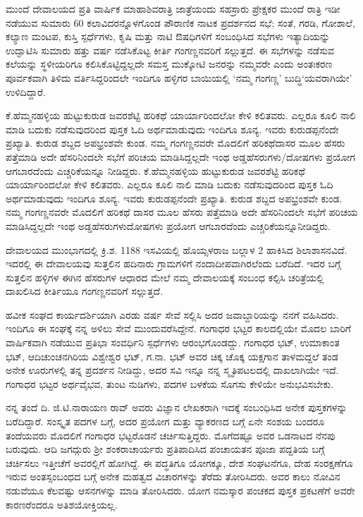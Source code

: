 {ಮುಂದೆ ದೇವಾಲಯದ ಪ್ರತಿ ವಾರ್ಷಿಕ ಮಾಹಾಶಿವರಾತ್ರಿ ಜಾತ್ರೆಯಂದು ಸಹಸ್ರಾರು ಪ್ರೇಕ್ಷಕರ ಮುಂದೆ ರಾತ್ರಿ ಇಡೀ ನಡೆಯುವ ಸುಮಾರು 60 ಕಲಾವಿದರನ್ನೊಳ\-ಗೊಂಡ ಪೌರಾಣಿಕ ನಾಟಕ ಪ್ರದರ್ಶನದ ಸಭೆ;  ಸಂತೆ, ಗರಡಿ, ಗೋಶಾಲೆ, ಕಲ್ಯಾಣ ಮಂಟಪ, ಕುಸ್ತಿ ಸ್ಪರ್ಧೆಗಳು, ಕೃಷಿ ಮತ್ತು ನಾಟಿ ಔಷಧಿಗಳಿಗೆ ಸಂಬಂಧಿಸಿದ ಸಭೆಗಳು ಇತ್ಯಾದಿಯನ್ನು ಉದ್ಘಾಟಿಸಿ ಸುಮಾರು ಹತ್ತು ವರ್ಷ ನಡೆಸಿಕೊಟ್ಟ ಕೀರ್ತಿ ಗಂಗಣ್ಣ\-ನವರಿಗೆ ಸಲ್ಲುತ್ತದೆ. ಈ ಸಭೆಗಳನ್ನು ನಡೆಸುವ ಕಲೆಯನ್ನು ಸ್ಥಳೀಯರಿಗೂ ಕಲಿಸಿ\-ಕೊಟ್ಟಿದ್ದಲ್ಲದೇ ಸಮಸ್ತ ಮುಕ್ಕೋಟಿ ಜನರನ್ನು ನಮ್ಮವರೇ ಎಂದು ಅಂತಃಕರಣ ಪೂರ್ವಕವಾಗಿ ತಿಳಿದು ವರ್ತಿಸಿದ್ದರಿಂದಲೇ ಇಂದಿಗೂ ಹಳ್ಳಿಗರ ಬಾಯಿಯಲ್ಲಿ  ‘ನಮ್ಮ ಗಂಗಣ್ಣ’ ಬುದ್ಧಿ‘ಯವರಾಗಿಯೇ’ ಉಳಿದಿದ್ದಾರೆ.

ಕೆ.ಹೆಮ್ಮನಹಳ್ಳಿಯ ಹುಟ್ಟುಕುರುಡ ಜವರಶೆಟ್ಟಿ ಹರಿಕಥೆ ಯಾರ್ಯಾರಿಂದಲೋ ಕೇಳಿ ಕಲಿತವರು. ಎಲ್ಲರೂ ಕೂಲಿ  \enginline{-}  ನಾಲಿ ಮಾಡಿ ಬದುಕು ನಡೆಸುವುದರಿಂದ ಪುಸ್ತಕ ಓದಿ ಅರ್ಥಮಾಡುವುದು ಇಂದಿಗೂ ಶೂನ್ಯ. ಇವರು ಕುರುಡಪ್ಪನೆಂದೇ ಪ್ರಖ್ಯಾತಿ. ಕುರುಡ ಶಬ್ದದ ಅಪಭ್ರಂಶವೇ ಕುಂಡ. ನಮ್ಮ ಗಂಗಣ್ಣನವರೇ ಮೊದಲಿಗೆ ಹರಿಕಥೆದಾಸರ ಮೂಲ ಹೆಸರು ಪತ್ತೆಮಾಡಿ ಅದೇ ಹೆಸರಿನಿಂದಲೇ ಸಭೆಗೆ ಪರಿಚಯ ಮಾಡಿಸಿದ್ದಲ್ಲದೇ ಇಂಥ ಅಡ್ಡಹೆಸರುಗಳು/ದೋಷಗಳು ಪ್ರಯೋಗ ಆಗಬಾರದೆಂದು ಎಚ್ಚರಿಕೆಯನ್ನೂ ನೀಡಿದ್ದರು.
ಕೆ.ಹೆಮ್ಮನಹಳ್ಳಿಯ ಹುಟ್ಟುಕುರುಡ ಜವರಶೆಟ್ಟಿ ಹರಿಕಥೆ ಯಾರ್ಯಾರಿಂದಲೋ ಕೇಳಿ ಕಲಿತವರು. ಎಲ್ಲರೂ ಕೂಲಿ  \enginline{-}  ನಾಲಿ ಮಾಡಿ ಬದುಕು ನಡೆಸುವುದರಿಂದ ಪುಸ್ತಕ ಓದಿ ಅರ್ಥಮಾಡುವುದು ಇಂದಿಗೂ ಶೂನ್ಯ. ಇವರು ಕುರುಡಪ್ಪನೆಂದೇ ಪ್ರಖ್ಯಾತಿ. ಕುರುಡ ಶಬ್ದದ ಅಪಭ್ರಂಶವೇ ಕುಂಡ. ನಮ್ಮ ಗಂಗಣ್ಣನವರೇ ಮೊದಲಿಗೆ ಹರಿಕಥೆ ದಾಸರ ಮೂಲ ಹೆಸರು ಪತ್ತೆಮಾಡಿ ಅದೇ ಹೆಸರಿನಿಂದಲೇ ಸಭೆಗೆ ಪರಿಚಯ ಮಾಡಿಸಿದ್ದಲ್ಲದೇ ಇಂಥ ಅಡ್ಡಹೆಸರುಗಳು\enginline{-}ದೋಷಗಳು ಪ್ರಯೋಗ ಆಗಬಾರದೆಂದು ಎಚ್ಚರಿಕೆಯನ್ನೂ\break ನೀಡಿದ್ದರು.

ದೇವಾಲಯದ ಮುಂಭಾಗದಲ್ಲಿ ಕ್ರಿ.ಶ. 1188 ಇಸವಿಯಲ್ಲಿ ಹೊಯ್ಸಳರಾಜ ಬಲ್ಲಾಳ 2 ಹಾಕಿಸಿದ ಶಿಲಾಶಾಸನವಿದೆ. ಇದರಲ್ಲಿ ಈ ದೇವಾಲಯವು ಸುತ್ತಲಿನ ಹದಿನಾರು ಗ್ರಾಮಗಳಿಗೆ ನಂದಾದೀಪವಾಗಿರಲೆಂದು ಬರೆದಿದೆ. ಇದರ ಬಗ್ಗೆ ಸುತ್ತಲಿನ ಹಳ್ಳಿಗಳ ಈಗಿನ ಹೆಸರುಗಳ ಆಧಾರದ ಮೇಲೆ ನಮ್ಮ ದೇವಾಲಯಕ್ಕೆ ಸಂಬಂಧ ಕಲ್ಪಿಸಿ ಚರಿತ್ರೆಯಲ್ಲಿ ದಾಖಲಿಸಿದ ಕೀರ್ತಿಯೂ ಗಂಗಣ್ಣನವರಿಗೆ ಸಲ್ಲುತ್ತದೆ.

ಹವೀಕ ಸಂಘದ ಕಾರ್ಯದರ್ಶಿಯಾಗಿ ಎರಡು ವರ್ಷ ಸೇವೆ ಸಲ್ಲಿಸಿ ಅದರ ಜವಾಬ್ದಾರಿಯನ್ನು ನನಗೆ ವಹಿಸಿದರು. ಇಂದಿಗೂ ಈ ಸಂಘಕ್ಕೆ ನನ್ನ ಅಳಿಲು ಸೇವೆ ಮುಂದುವರೆಸಿದ್ದೇನೆ. ಗಂಗಾಧರ ಭಟ್ಟರ ಕಾಲದಲ್ಲಿಯೇ ಮೊದಲ ಬಾರಿಗೆ ವಾರ್ಷಿಕವಾಗಿ ನಡೆಯುವ ಪ್ರತಿಭಾ ಸಂವರ್ಧಿನಿ ಸ್ಪರ್ಧೆಗಳು ಆರಂಭಗೊಂಡದ್ದು. ಗಂಗಾಧರ ಭಟ್, ಉಮಾಕಾಂತ ಭಟ್, ಆದಿಚುಂಚನಗಿರಿಯ ವಿಶ್ವೇಶ್ವರ ಭಟ್, ಗ.ನಾ. ಭಟ್ ಅವರ ಚಿಕ್ಕ  \enginline{-}  ಚೊಕ್ಕ ಯಕ್ಷಗಾನ ತಾಳಮದ್ದಲೆ ತಂಡ ಅನೇಕ ಊರುಗಳಲ್ಲಿ ತನ್ನ ಪ್ರದರ್ಶನ ನೀಡಿದ್ದು, ಅದರ ಸವಿ ಇನ್ನೂ ನನ್ನ ಸ್ಮೃತಿಪಟಲದಲ್ಲಿ ದಾಖಲಾಗಿಯೇ ಇದೆ. ಗಂಗಾಧರ ಭಟ್ಟರ ಅರ್ಥವೈಭವ, ತುಂಟ ನುಡಿಗಳು, ಪದಗಳ ಬಳಕೆಯ ಸೊಗಸು ಕೇಳಿಯೇ ಅನುಭವಿಸಬೇಕು.

ನನ್ನ ತಂದೆ ದಿ. ಜಿ.ಟಿ.ನಾರಾಯಣ ರಾವ್ ಅವರು ವಿಜ್ಞಾನ ಲೇಖಕರಾಗಿ ಇದಕ್ಕೆ ಸಂಬಂಧಿಸಿದ ಅನೇಕ ಪುಸ್ತಕಗಳನ್ನು ಬರೆದಿದ್ದಾರೆ. ಸಂಸ್ಕೃತ ಪದಗಳ ಬಗ್ಗೆ, ಅದರ ಪ್ರಯೋಗ ಮತ್ತು ವ್ಯಾಕರಣದ ಬಗ್ಗೆ ಏನೇ ಸಂಶಯ ಬಂದರೂ ತಂದೆಯವರು ಮೊದಲಿಗೆ ಗಂಗಾಧರ ಭಟ್ಟರೊಡನೆ ಚರ್ಚಿಸುತ್ತಿದ್ದರು. ಮೊಗೆದಷ್ಟೂ ಅವರ ಒಡನಾಟದ ನೆನಪು ಬರುವುದು. ಆದಿ ಜಗದ್ಗುರು ಶ್ರೀ ಶಂಕರಾಚಾರ್ಯರು ಪ್ರತಿಪಾದಿಸಿದ ಪಂಚಾಯತನ ಪೂಜಾ ಪದ್ದತಿಯ ಬಗ್ಗೆ ಚರ್ಚಿಸಲು ಇತ್ತೀಚೆಗೆ ಅವರಲ್ಲಿಗೆ ಹೋಗಿದ್ದೆ. ಈ ಪದ್ಧತಿಗೂ ಯೋಗಕ್ಕೂ, ದೇಶ ಸಂಘಟನೆಗೂ, ದೇಹ ಸಂರಕ್ಷಣೆಗೂ ಇರುವ ಅಂತಸ್ಸಂಬಂಧದ ಬಗ್ಗೆ ಅನೇಕ ಮಹತ್ವದ ವಿಚಾರಗಳನ್ನು ತೆರೆದು ತೋರಿಸಿದರು. ಅವರ ಕಾಲು ನೋವಿನ ನಡುವೆಯೂ ಕೆಲವಷ್ಟು ಆಸನಗಳನ್ನು ಮಾಡಿ ತೋರಿಸಿದರು. ಯೋಗ ನಮಸ್ಕಾರ ಪಂಚಕದ ಪುಸ್ತಕ ಪ್ರಕಟಣೆಗೆ ಅವರೇ ಕಾರಣರೆಂದರೂ ಅತಿಶಯೋಕ್ತಿಯಲ್ಲ. 

}

